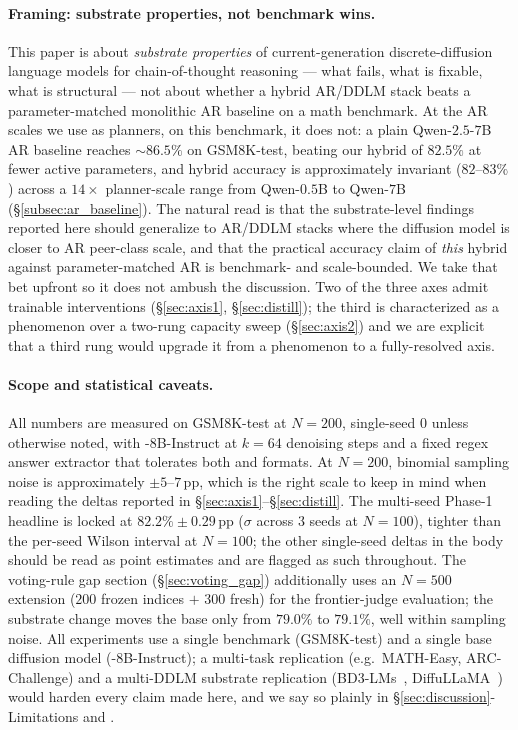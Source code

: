 \paragraph{Framing: substrate properties, not benchmark wins.}
This paper is about \emph{substrate properties} of current-generation
discrete-diffusion language models for chain-of-thought reasoning
--- what fails, what is fixable, what is structural --- not about
whether a hybrid AR/DDLM stack beats a parameter-matched
monolithic AR baseline on a math benchmark.  At the AR scales we use
as planners, on this benchmark, it does not: a plain
Qwen-$2.5$-$7$B AR baseline reaches $\sim 86.5\%$ on GSM8K-test,
beating our hybrid \cmajc{} of $82.5\%$ at fewer active parameters,
and hybrid accuracy is approximately invariant ($82\text{--}83\%$)
across a $14\times$ planner-scale range from Qwen-$0.5$B to
Qwen-$7$B (\S\ref{subsec:ar_baseline}).  The natural read is that
the substrate-level findings reported here should generalize to
AR/DDLM stacks where the diffusion model is closer to AR
peer-class scale, and that the practical accuracy claim of
\emph{this} hybrid against parameter-matched AR is benchmark- and
scale-bounded.  We take that bet upfront so it does not ambush the
discussion.  Two of the three axes admit trainable interventions
(\S\ref{sec:axis1}, \S\ref{sec:distill}); the third is
characterized as a phenomenon over a two-rung capacity sweep
(\S\ref{sec:axis2}) and we are explicit that a third rung would
upgrade it from a phenomenon to a fully-resolved axis.

\paragraph{Scope and statistical caveats.}
All numbers are measured on GSM8K-test at $N{=}200$, single-seed
$0$ unless otherwise noted, with \LLaDA{}-8B-Instruct at $k{=}64$
denoising steps and a fixed regex answer extractor that tolerates
both  and \code{\#\#\#\#} formats.  At $N{=}200$,
binomial sampling noise is approximately $\pm 5\text{--}7$\,pp,
which is the right scale to keep in mind when reading the
deltas reported in \S\ref{sec:axis1}--\S\ref{sec:distill}.  The
multi-seed Phase-1 \cmajc{} headline is locked at
$82.2\% \pm 0.29$\,pp ($\sigma$ across $3$ seeds at $N{=}100$),
tighter than the per-seed Wilson interval at $N{=}100$; the other
single-seed deltas in the body should be read as point estimates
and are flagged as such throughout.  The voting-rule gap section
(\S\ref{sec:voting_gap}) additionally uses an $N{=}500$ extension
($200$ frozen indices $+$ $300$ fresh) for the frontier-judge
evaluation; the substrate change moves the base \cmaj{} only from
$79.0\%$ to $79.1\%$, well within sampling noise.
All experiments use a single benchmark (GSM8K-test) and a single
base diffusion model (\LLaDA{}-8B-Instruct); a multi-task
replication (e.g.\ MATH-Easy, ARC-Challenge) and a multi-DDLM
substrate replication (BD3-LMs~\citep{arriola2025bd3lms},
DiffuLLaMA~\citep{gong2024diffullama}) would harden every claim
made here, and we say so plainly in
\S\ref{sec:discussion}-Limitations and .


